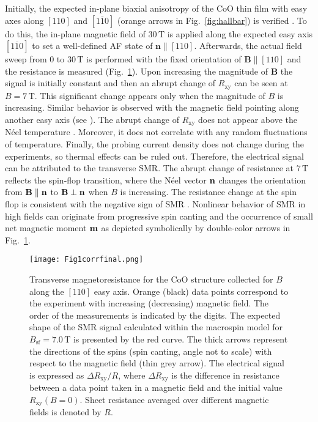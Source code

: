 \documentclass[%
 aps,
prl,
superscriptaddress,
 amsmath,amssymb,
reprint,%
]{revtex4-2}
\begin{document}
Initially, the expected in-plane biaxial anisotropy of the CoO thin film with easy axes along $[110]$ and $[1\overline{1}0]$ (orange arrows in Fig.~\ref{fig:hallbar}) is verified \cite{Baldrati2020PRL, CaO2011APL}. To do this, the in-plane magnetic field of $30\,\text{T}$ is applied along the expected easy axis $[1\overline{1}0]$ to set a well-defined AF state of $\mathbf{n} \parallel [110]$. Afterwards, the actual field sweep from 0 to $30\,\text{T}$ is performed with the fixed orientation of $\mathbf{B} \parallel [110]$ and the resistance is measured (Fig.~\ref{fig:spinflopsminus}). Upon increasing the magnitude of $\mathbf{B}$ the signal is initially constant and then an abrupt change of $R_\text{xy}$ can be seen at $B=7\,$T. This significant change appears only when the magnitude of $B$ is increasing. Similar behavior is observed with the magnetic field pointing along another easy axis (see \cite{supplement}). The abrupt change of $R_\text{xy}$ does not appear above the N\'eel temperature \cite{supplement}. Moreover, it does not correlate with any random fluctuations of temperature. Finally, the probing current density does not change during the experiments, so thermal effects can be ruled out. Therefore, the electrical signal can be attributed to the transverse SMR. The abrupt change of resistance at $7\,\text{T}$ reflects the spin-flop transition, where the N\'eel vector $\bf{n}$ changes the orientation from $\bf{B} \parallel \bf{n}$ to $\bf{B} \perp \bf{n}$ when $B$ is increasing. The resistance change at the spin flop is consistent with the negative sign of SMR \cite{Baldrati2020PRL, Nakayama2013PRL, Hoogeboom2017APL}. Nonlinear behavior of SMR in high fields can originate from progressive spin canting and the occurrence of small net magnetic moment $\bf{m}$ as depicted symbolically by double-color arrows in Fig.~\ref{fig:spinflopsminus}. 

\begin{figure}
\texttt{[image: Fig1corrfinal.png]}
\caption{\label{fig:spinflopsminus}Transverse magnetoresistance for the CoO structure collected for $B$ along the $[110]$ easy axis. Orange (black) data points correspond to the experiment with increasing (decreasing) magnetic field. The order of the measurements is indicated by the digits. The expected shape of the SMR signal calculated within the macrospin model for $B_{\text{sf}}=7.0\,\text{T}$ is presented by the red curve. The thick arrows represent the directions of the spins (spin canting, angle not to scale) with respect to the magnetic field (thin grey arrow). The electrical signal is expressed as $\Delta R_{\text{xy}}/R$, where $\Delta R_{\text{xy}}$ is the difference in resistance between a data point taken in a magnetic field and the initial value $R_{\text{xy}}(B=0)$. Sheet resistance averaged over different magnetic fields is denoted by $R$.}
\end{figure}
\end{document}
